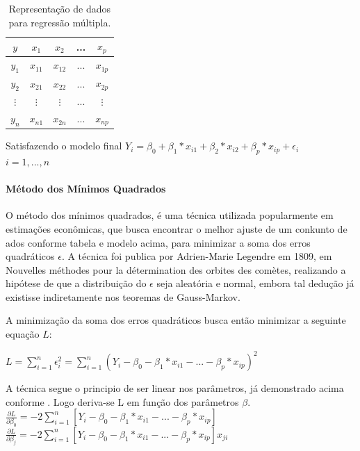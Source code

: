 \documentclass[	12pt, Times, openright, twoside, a4paper, english, brazil]{abntex2}
\begin{document}
          \begin{table}[!ht]
          	\centering
          		\caption{Representação de dados para regressão múltipla.}	\label{tab:regressaoMultiplaEstrutura}                  
          				\begin{tabular}{|c|c|c|c|c}          			
          				\hline $y$ & $x_1$ & $x_2$ & ... & $x_p$\\
                        \hline $y_1$ & $x_{11}$ & $x_{12}$ & ... & $x_{1p}$\\
                        \hline $y_2$ & $x_{21}$ & $x_{22}$ & ... & $x_{2p}$\\
                        \hline $\vdots$ & $\vdots$ & $\vdots$ & ... & $\vdots$\\
                        \hline $y_n$ & $x_{n1}$ & $x_{2n}$ & ... & $x_{np}$\\
          		\end{tabular}
          \end{table}
          Satisfazendo o modelo final $Y_i = \beta_0 + \beta_1*x_{i1} + \beta_2*x_{i2} + \beta_p*x_{ip} + \epsilon_i$\\
          $i=1,...,n$
          
          \paragraph{Método dos Mínimos Quadrados}
          O método dos mínimos quadrados, é uma técnica utilizada popularmente em estimações econômicas, que busca encontrar o melhor ajuste de um conkunto de ados conforme tabela e modelo acima, para minimizar a soma dos erros quadráticos $\epsilon$. A técnica foi publica por Adrien-Marie Legendre em 1809, em Nouvelles méthodes pour la détermination des orbites des comètes, realizando a hipótese de que a distribuição do $\epsilon$ seja aleatória e normal, embora tal dedução já existisse indiretamente nos teoremas de Gauss-Markov.
          
          A minimização da soma dos erros quadráticos busca então minimizar a seguinte equação $L$:
          
          $L = \sum_{i=1}^{n} \epsilon_i^2 = \sum_{i=1}^{n}(Y_i-\beta_0-\beta_1*x_{i1}-...-\beta_p*x_{ip})^2$
          
           A técnica segue o principio de ser linear nos parâmetros, já demonstrado acima conforme \cite{Clarice2011}.
           Logo deriva-se L em função dos parâmetros $\beta$.\\
           $\frac {\partial L}{\partial \beta_0} = -2 \sum_{i=1}^{n}[Y_i-\beta_0-\beta_1*x_{i1}-...-\beta_p*x_{ip}]$\\
           $\frac {\partial L}{\partial \beta_j} = -2 \sum_{i=1}^{n}[Y_i-\beta_0-\beta_1*x_{i1}-...-\beta_p*x_{ip}]x_{ji}$
          
\end{document}
